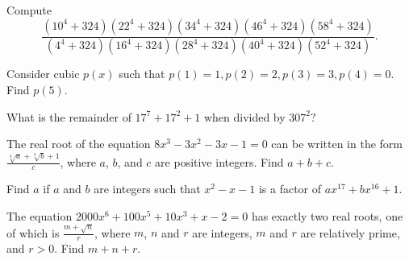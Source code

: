 \documentclass{article}
\begin{document}
\begin{prob}[AIME 1987/14]{4}
Compute
\[\frac{(10^4+324)(22^4+324)(34^4+324)(46^4+324)(58^4+324)}{(4^4+324)(16^4+324)(28^4+324)(40^4+324)(52^4+324)}.\]
\end{prob}

\begin{prob}[]{4}
Consider cubic $p(x)$ such that $p(1)=1,p(2)=2,p(3)=3,p(4)=0.$ Find $p(5).$
\end{prob}
    
\begin{req}[JMC 10 2020/22]{6}
What is the remainder of $17^7+17^2+1$ when divided by $307^2?$
\end{req}
    
\begin{prob}[AIME I 2013/5]{9}
The real root of the equation $8x^3 - 3x^2 - 3x - 1 = 0$ can be written in the form $\frac{\sqrt[3]a + \sqrt[3]b + 1}{c}$, where $a$, $b$, and $c$ are positive integers. Find $a+b+c$.
\end{prob}
    
\begin{prob}[AIME 1988/13]{13}
Find $a$ if $a$ and $b$ are integers such that $x^2 - x - 1$ is a factor of $ax^{17} + bx^{16} + 1$.
\end{prob}
    
\begin{prob}[AIME II 2000/13]{13}
The equation $2000x^6+100x^5+10x^3+x-2=0$ has exactly two real roots, one of which is $\frac{m+\sqrt{n}}r$, where $m$, $n$ and $r$ are integers, $m$ and $r$ are relatively prime, and $r>0$. Find $m+n+r$.
\end{prob}
\end{document}
